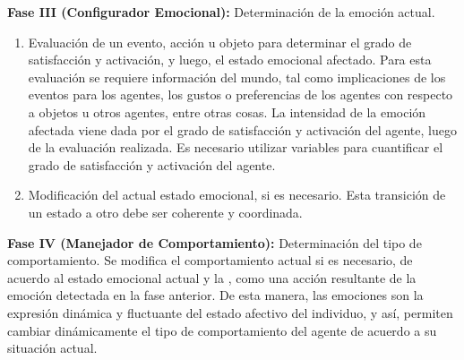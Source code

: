 \textbf{Fase III (Configurador Emocional):} Determinación de la emoción actual.

\begin{enumerate}
\item Evaluación de un evento, acción u objeto para determinar el grado de
satisfacción y activación, y luego, el estado emocional afectado. Para esta
evaluación se requiere información del mundo, tal como implicaciones de los
eventos para los agentes, los gustos o preferencias de los agentes con respecto
a objetos u otros agentes, entre otras cosas. La intensidad de la emoción
afectada viene dada por el grado de satisfacción y activación del agente, luego
de la evaluación realizada. Es necesario utilizar variables para cuantificar el
grado de satisfacción y activación del agente.
\item Modificación del actual estado emocional, si es necesario. Esta transición de
un estado a otro debe ser coherente y coordinada.
\end{enumerate}

\textbf{Fase IV (Manejador de Comportamiento):} Determinación del tipo de comportamiento.
Se modifica el comportamiento actual si es necesario, de acuerdo al estado
emocional actual y la , como una acción resultante de la emoción
detectada en la fase anterior. De esta manera, las emociones son la expresión
dinámica y fluctuante del estado afectivo del individuo, y así, permiten cambiar
dinámicamente el tipo de comportamiento del agente de acuerdo a su situación
actual.

